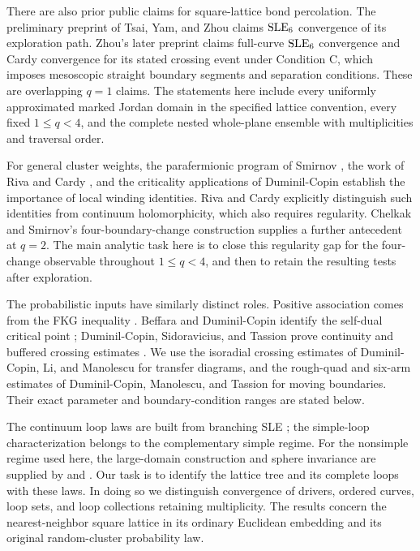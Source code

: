 There are also prior public claims for square-lattice bond percolation.
The preliminary preprint of Tsai, Yam, and Zhou
\citep{TsaiYamZhou2013SquareBond} claims $\operatorname{SLE}_6$ convergence of its
exploration path.  Zhou's later preprint \citep{Zhou2024SquareBond}
claims full-curve $\operatorname{SLE}_6$ convergence and Cardy convergence for its
stated crossing event under Condition C,
which imposes mesoscopic straight boundary segments and separation
conditions.  These are overlapping $q=1$ claims.  The statements here
include every uniformly approximated marked Jordan domain in the
specified lattice convention, every fixed $1\le q<4$, and the complete
nested whole-plane ensemble with multiplicities and traversal order.

For general cluster weights, the parafermionic program of Smirnov
\citep{Smirnov2010}, the work of Riva and Cardy \citep{RivaCardy2006},
and the criticality applications of Duminil-Copin
\citep{DuminilCopin2012Parafermion} establish the importance of local
winding identities.  Riva and Cardy explicitly distinguish such
identities from continuum holomorphicity, which also requires
regularity.  Chelkak and Smirnov's four-boundary-change construction
\citep[Section~6]{ChelkakSmirnov2012} supplies a further antecedent at
$q=2$.  The main analytic task here is to close this regularity gap for
the four-change observable throughout $1\le q<4$, and then to retain
the resulting tests after exploration.

The probabilistic inputs have similarly distinct roles.  Positive
association comes from the FKG inequality
\citep{FortuinKasteleynGinibre1971}.  Beffara and Duminil-Copin identify
the self-dual critical point \citep{BeffaraDuminilCopin2012};
Duminil-Copin, Sidoravicius, and Tassion prove continuity and buffered
crossing estimates \citep{DuminilCopinSidoraviciusTassion2017}.
We use the isoradial crossing estimates of Duminil-Copin, Li, and
Manolescu \citep{DCLM2019Isoradial} for transfer diagrams, and the
rough-quad and six-arm estimates of Duminil-Copin, Manolescu, and
Tassion \citep{DMT2021Fractal} for moving boundaries.  Their exact
parameter and boundary-condition ranges are stated below.

The continuum loop laws are built from branching SLE
\citep{Sheffield2009Exploration,MillerSheffield2016IG1,MillerSheffield2016IG3};
the simple-loop characterization \citep{SheffieldWerner2012} belongs
to the complementary simple regime.  For the nonsimple regime used
here, the large-domain construction and sphere invariance are supplied
by \citet{MillerWatsonWilson2015} and \citet{GwynneMillerQian2021}.
Our task is to identify the lattice tree and its complete loops with
these laws.  In doing so we distinguish convergence of drivers, ordered
curves, loop sets, and loop collections retaining multiplicity.
The results concern the nearest-neighbor square lattice in its ordinary
Euclidean embedding and its original random-cluster probability law.

